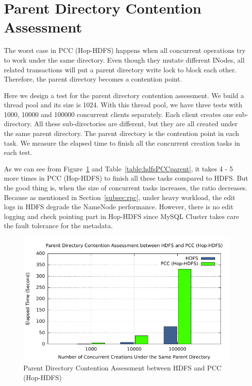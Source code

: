 \section{Parent Directory Contention Assessment}
The worst case in PCC (Hop-HDFS) happens when all concurrent operations try to work under the same directory. Even though they mutate different INodes, all related transactions will put a parent directory write lock to block each other. Therefore, the parent directory becomes a contention point.

\noindent Here we design a test for the parent directory contention assessment. We build a thread pool and its size is 1024. With this thread pool, we have three tests with 1000, 10000 and 100000 concurrent clients separately. Each client creates one sub-directory. All these sub-directories are different, but they are all created under the same parent directory. The parent directory is the contention point in each task. We measure the elapsed time to finish all the concurrent creation tasks in each test.

\noindent As we can see from Figure~\ref{fig:hdfsPCCparent} and Table~\ref{table:hdfsPCCparent}, it takes 4 - 5 more times in PCC (Hop-HDFS) to finish all these tasks compared to HDFS. But the good thing is, when the size of concurrent tasks increases, the ratio decreases. Because as mentioned in Section~\ref{subsec:rpc}, under heavy workload, the edit logs in HDFS degrade the NameNode performance. However, there is no edit logging and check pointing part in Hop-HDFS since MySQL Cluster takes care the fault tolerance for the metadata.

\begin{figure}[h]
	\centering
	\includegraphics[width=\linewidth]{figs/hdfs_pcc_parentlock.pdf}
	\caption{Parent Directory Contention Assessment between HDFS and PCC (Hop-HDFS)}
	\label{fig:hdfsPCCparent}
\end{figure}

